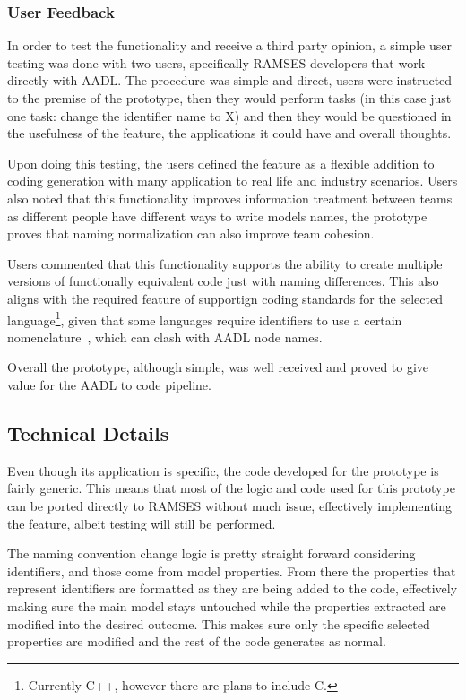 \subsubsection{User Feedback}

In order to test the functionality and receive a third party opinion, a simple user testing was done with two users, specifically \gls{RAMSES} developers that work directly with \gls{AADL}. The procedure was simple and direct, users were instructed to the premise of the prototype, then they would perform tasks (in this case just one task: change the identifier name to X) and then they would be questioned in the usefulness of the feature, the applications it could have and overall thoughts.

Upon doing this testing, the users defined the feature as a flexible addition to coding generation with many application to real life and industry scenarios. Users also noted that this functionality improves information treatment between teams as different people have different ways to write models names, the prototype proves that naming normalization can also improve team cohesion.

Users commented that this functionality supports the ability to create multiple versions of functionally equivalent code just with naming differences. This also aligns with the required feature of supportign coding standards for the selected language\footnote{Currently C++, however there are plans to include C.}, given that some languages require identifiers to use a certain nomenclature~\cite{Google_cpp_style_guide, Python_coding_style}, which can clash with \gls{AADL} node names.

Overall the prototype, although simple, was well received and proved to give value for the \gls{AADL} to code pipeline.

\subsection{Technical Details}
\label{sec:prototype_technical_details}

Even though its application is specific, the code developed for the prototype is fairly generic. This means that most of the logic and code used for this prototype can be ported directly to RAMSES without much issue, effectively implementing the feature, albeit testing will still be performed.

The naming convention change logic is pretty straight forward considering identifiers, and those come from model properties. From there the properties that represent identifiers are formatted as they are being added to the code, effectively making sure the main model stays untouched while the properties extracted are modified into the desired outcome. This makes sure only the specific selected properties are modified and the rest of the code generates as normal.

